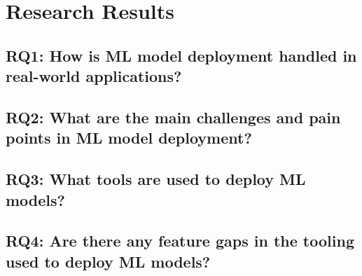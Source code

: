 \chapter{Research Results}
\section{RQ1: How is ML model deployment handled in real-world applications?}
\section{RQ2: What are the main challenges and pain points in ML model deployment?}
\section{RQ3: What tools are used to deploy ML models?}
\section{RQ4: Are there any feature gaps in the tooling used to deploy ML models?}